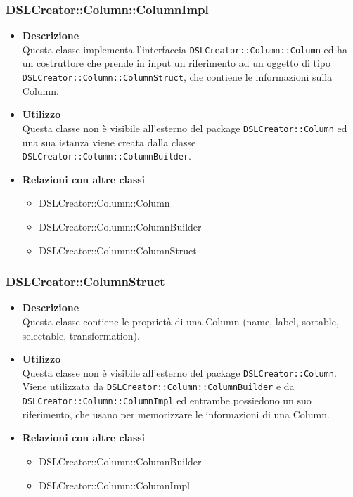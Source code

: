  \subsubsection{DSLCreator::Column::ColumnImpl}
                    \begin{itemize}
                        \item \textbf{Descrizione} \hfill \\
                          Questa classe implementa l'interfaccia \texttt{DSLCreator::Column::Column} ed ha un costruttore che prende in input un riferimento ad un oggetto di tipo \texttt{DSLCreator::Co\-lumn::ColumnStruct}, che contiene le informazioni sulla Column.
                        \item \textbf{Utilizzo} \hfill \\
                          Questa classe non è visibile all'esterno del package \texttt{DSLCreator::Column} ed una sua istanza viene creata dalla classe \texttt{DSLCreator::Column::ColumnBuilder}.
                        \item \textbf{Relazioni con altre classi}
                            \begin{itemize}
                              \item DSLCreator::Column::Column
                              \item DSLCreator::Column::ColumnBuilder
                              \item DSLCreator::Column::ColumnStruct
                            \end{itemize}
                    \end{itemize}  

 \subsubsection{DSLCreator::ColumnStruct}
                    \begin{itemize}
                        \item \textbf{Descrizione} \hfill \\
                          Questa classe contiene le proprietà di una Column (name, label, sortable, selectable, transformation).
                        \item \textbf{Utilizzo} \hfill \\
                          Questa classe non è visibile all'esterno del package \texttt{DSLCreator::Column}. Viene utilizzata da \texttt{DSLCreator::Column::ColumnBuilder} e da \texttt{DSLCreator::Column::ColumnImpl} ed entrambe possiedono un suo riferimento, che usano per memorizzare le informazioni di una Column.
                        \item \textbf{Relazioni con altre classi}
                            \begin{itemize}
                              \item DSLCreator::Column::ColumnBuilder
                              \item DSLCreator::Column::ColumnImpl
                            \end{itemize}
                    \end{itemize}  

